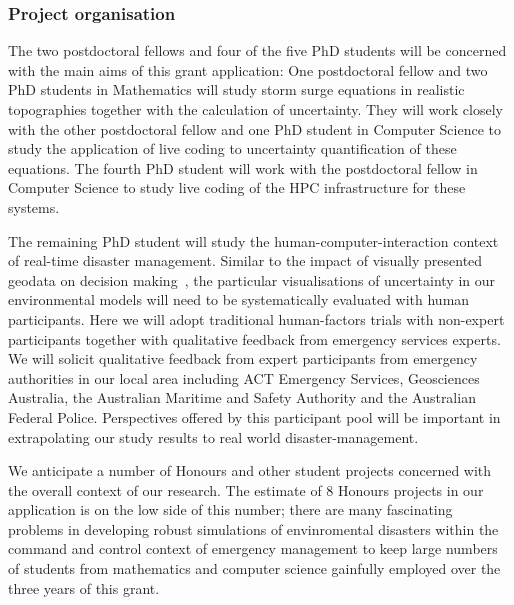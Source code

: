 \subsubsection*{Project organisation}

The two postdoctoral fellows and four of the five PhD students 
will be concerned with the main aims of this grant application: One postdoctoral fellow and two PhD students in 
Mathematics will study storm surge equations in realistic topographies together with the calculation of uncertainty. They will work closely with the other postdoctoral fellow 
and one PhD student in Computer Science to study the application of live coding to uncertainty quantification of these equations. The fourth
PhD student will work with the postdoctoral fellow in Computer Science to study live coding of the HPC infrastructure for these systems.

The remaining PhD student will study the human-computer-interaction context of real-time disaster management. 
Similar to the impact of visually presented geodata on decision
making~\parencite{kinkeldey2015evaluating}, the particular
visualisations of uncertainty in our environmental models will need to
be systematically evaluated with human participants. Here we will
adopt traditional human-factors trials with non-expert participants
together with qualitative feedback from emergency services experts. We
will solicit qualitative feedback from expert participants from
emergency authorities in our local area including ACT Emergency
Services, Geosciences Australia, the Australian Maritime and Safety
Authority and the Australian Federal Police. Perspectives offered by
this participant pool will be important in extrapolating our study
results to real world disaster-management.

We anticipate a number of Honours and other student projects concerned with the overall context of our research. The estimate 
of 8 Honours projects in our application is on the low side of this number; there are many 
fascinating problems in developing robust simulations of envinromental disasters
within the command and control context of emergency management to 
keep large numbers of students from mathematics and computer science gainfully employed over the three years of this grant.






 



